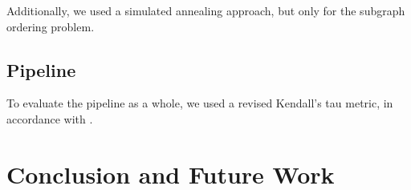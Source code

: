 \documentclass[12pt]{article}
\begin{document}
Additionally, we used a simulated annealing approach, but only for the
subgraph ordering problem.

\subsection{Pipeline}

To evaluate the pipeline as a whole, we used a revised Kendall's tau metric, in
accordance with \cite{lapata2006automatic}.

\section{Conclusion and Future Work}

\pagebreak


\end{document}
